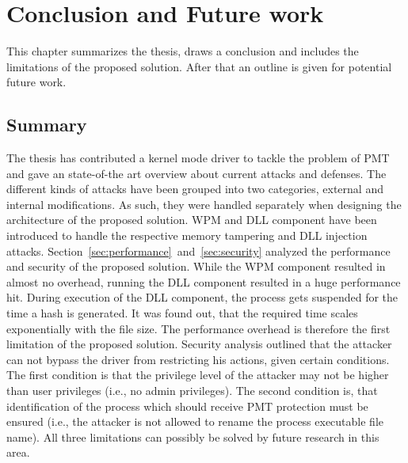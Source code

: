 \section{Conclusion and Future work}
\label{sec:futurework}
This chapter summarizes the thesis, draws a conclusion and includes the limitations of the proposed solution. After that an outline is given for potential future work.
\subsection{Summary}
The thesis has contributed a kernel mode driver to tackle the problem of \gls{PMT} and gave an state-of-the art overview about current attacks and defenses. The different kinds of attacks have been grouped into two categories, external and internal modifications. As such, they were handled separately when designing the architecture of the proposed solution. \gls{WPM} and \gls{DLL} component have been introduced to handle the respective memory tampering and \gls{DLL} injection attacks. Section~\ref{sec:performance}~and~\ref{sec:security} analyzed the performance and security of the proposed solution. While the \gls{WPM} component resulted in almost no overhead, running the \gls{DLL} component resulted in a huge performance hit. During execution of the \gls{DLL} component, the process gets suspended for the time a hash is generated. It was found out, that the required time scales exponentially with the file size. The performance overhead is therefore the first limitation of the proposed solution. Security analysis outlined that the attacker can not bypass the driver from restricting his actions, given certain conditions. The first condition is that the privilege level of the attacker may not be higher than user privileges (i.e., no admin privileges). The second condition is, that identification of the process which should receive \gls{PMT} protection must be ensured (i.e., the attacker is not allowed to rename the process executable file name). All three limitations can possibly be solved by future research in this area.
